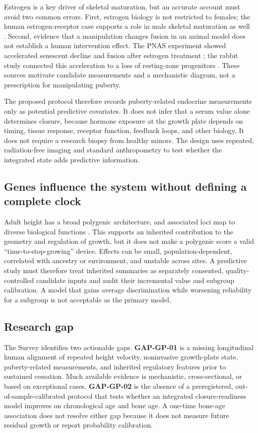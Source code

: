 \documentclass[conference]{IEEEtran}
\begin{document}
Estrogen is a key driver of skeletal maturation, but an accurate account must avoid two common errors. First, estrogen biology is not restricted to females; the human estrogen-receptor case supports a role in male skeletal maturation as well \cite{smith1994}. Second, evidence that a manipulation changes fusion in an animal model does not establish a human intervention effect. The PNAS experiment showed accelerated senescent decline and fusion after estrogen treatment \cite{weise2001}; the rabbit study connected this acceleration to a loss of resting-zone progenitors \cite{nilsson2014}. These sources motivate candidate measurements and a mechanistic diagram, not a prescription for manipulating puberty.

The proposed protocol therefore records puberty-related endocrine measurements only as potential predictive covariates. It does not infer that a serum value alone determines closure, because hormone exposure at the growth plate depends on timing, tissue response, receptor function, feedback loops, and other biology. It does not require a research biopsy from healthy minors. The design uses repeated, radiation-free imaging and standard anthropometry to test whether the integrated state adds predictive information.

\subsection{Genes influence the system without defining a complete clock}

Adult height has a broad polygenic architecture, and associated loci map to diverse biological functions \cite{wood2014}. This supports an inherited contribution to the geometry and regulation of growth, but it does not make a polygenic score a valid ``time-to-stop-growing'' device. Effects can be small, population-dependent, correlated with ancestry or environment, and unstable across sites. A predictive study must therefore treat inherited summaries as separately consented, quality-controlled candidate inputs and audit their incremental value and subgroup calibration. A model that gains average discrimination while worsening reliability for a subgroup is not acceptable as the primary model.

\subsection{Research gap}

The Survey identifies two actionable gaps. \textbf{GAP-GP-01} is a missing longitudinal human alignment of repeated height velocity, noninvasive growth-plate state, puberty-related measurements, and inherited regulatory features prior to sustained cessation. Much available evidence is mechanistic, cross-sectional, or based on exceptional cases. \textbf{GAP-GP-02} is the absence of a preregistered, out-of-sample-calibrated protocol that tests whether an integrated closure-readiness model improves on chronological age and bone age. A one-time bone-age association does not resolve either gap because it does not measure future residual growth or report probability calibration.
\end{document}
